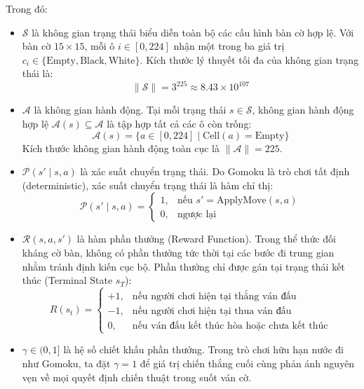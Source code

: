 \documentclass[11pt,a4paper]{report}
\begin{document}
Trong đó:
\begin{itemize}
    \item $\mathcal{S}$ là không gian trạng thái biểu diễn toàn bộ các cấu hình bàn cờ hợp lệ. Với bàn cờ $15 \times 15$, mỗi ô $i \in [0, 224]$ nhận một trong ba giá trị $c_i \in \{\text{Empty}, \text{Black}, \text{White}\}$. Kích thước lý thuyết tối đa của không gian trạng thái là:
    \begin{equation}
        \|\mathcal{S}\| = 3^{225} \approx 8.43 \times 10^{107}
    \end{equation}
    \item $\mathcal{A}$ là không gian hành động. Tại mỗi trạng thái $s \in \mathcal{S}$, không gian hành động hợp lệ $\mathcal{A}(s) \subseteq \mathcal{A}$ là tập hợp tất cả các ô còn trống:
    \begin{equation}
        \mathcal{A}(s) = \{ a \in [0, 224] \mid \text{Cell}(a) = \text{Empty} \}
    \end{equation}
    Kích thước không gian hành động toàn cục là $\|\mathcal{A}\| = 225$.
    \item $\mathcal{P}(s' \mid s, a)$ là xác suất chuyển trạng thái. Do Gomoku là trò chơi tất định (deterministic), xác suất chuyển trạng thái là hàm chỉ thị:
    \begin{equation}
        \mathcal{P}(s' \mid s, a) = \begin{cases} 
            1, & \text{nếu } s' = \text{ApplyMove}(s, a) \\ 
            0, & \text{ngược lại} 
        \end{cases}
    \end{equation}
    \item $\mathcal{R}(s, a, s')$ là hàm phần thưởng (Reward Function). Trong thể thức đối kháng cờ bàn, không có phần thưởng tức thời tại các bước đi trung gian nhằm tránh định kiến cục bộ. Phần thưởng chỉ được gán tại trạng thái kết thúc (Terminal State $s_T$):
    \begin{equation}
        R(s_t) = \begin{cases} 
            +1, & \text{nếu người chơi hiện tại thắng ván đấu} \\
            -1, & \text{nếu người chơi hiện tại thua ván đấu} \\
            0, & \text{nếu ván đấu kết thúc hòa hoặc chưa kết thúc}
        \end{cases}
    \end{equation}
    \item $\gamma \in (0, 1]$ là hệ số chiết khấu phần thưởng. Trong trò chơi hữu hạn nước đi như Gomoku, ta đặt $\gamma = 1$ để giá trị chiến thắng cuối cùng phản ánh nguyên vẹn về mọi quyết định chiến thuật trong suốt ván cờ.
\end{itemize}
\end{document}

